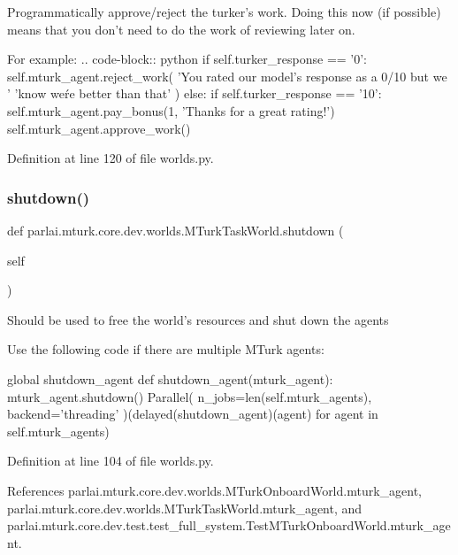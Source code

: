 \begin{DoxyVerb}Programmatically approve/reject the turker's work. Doing this now
(if possible) means that you don't need to do the work of reviewing
later on.

For example:
.. code-block:: python
    if self.turker_response == '0':
self.mturk_agent.reject_work(
    'You rated our model's response as a 0/10 but we '
    'know we\'re better than that'
)
    else:
if self.turker_response == '10':
    self.mturk_agent.pay_bonus(1, 'Thanks for a great rating!')
self.mturk_agent.approve_work()
\end{DoxyVerb}
 

Definition at line 120 of file worlds.\+py.

\mbox{\label{classparlai_1_1mturk_1_1core_1_1dev_1_1worlds_1_1MTurkTaskWorld_a1948a7ac9d8baad030c239c97aba747b}} 
\subsubsection{\texorpdfstring{shutdown()}{shutdown()}}
{\footnotesize\ttfamily def parlai.\+mturk.\+core.\+dev.\+worlds.\+M\+Turk\+Task\+World.\+shutdown (\begin{DoxyParamCaption}\item[{}]{self }\end{DoxyParamCaption})}

\begin{DoxyVerb}Should be used to free the world's resources and shut down the agents

Use the following code if there are multiple MTurk agents:

global shutdown_agent
def shutdown_agent(mturk_agent):
    mturk_agent.shutdown()
Parallel(
    n_jobs=len(self.mturk_agents),
    backend='threading'
)(delayed(shutdown_agent)(agent) for agent in self.mturk_agents)
\end{DoxyVerb}
 

Definition at line 104 of file worlds.\+py.



References parlai.\+mturk.\+core.\+dev.\+worlds.\+M\+Turk\+Onboard\+World.\+mturk\+\_\+agent, parlai.\+mturk.\+core.\+dev.\+worlds.\+M\+Turk\+Task\+World.\+mturk\+\_\+agent, and parlai.\+mturk.\+core.\+dev.\+test.\+test\+\_\+full\+\_\+system.\+Test\+M\+Turk\+Onboard\+World.\+mturk\+\_\+agent.



